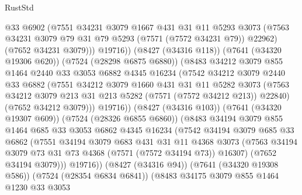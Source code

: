 \begin{lexlean}{RustStd}
\begin{coremodule}
{\begin{coremodule}
{{{{{{{{{{{{{{{{{{{{{{{{{{{{{{{{                      @33
                      @6902
                      (@7551
                        @34231
                        @3079
                        @1667
                        @431
                        @31
                        @11
                        @5293
                        @3073
                        (@7563 @34231 @3079 @79 @31 @79 @5293 (@7571 (@7572 @34231 @79)) @22962)
                        (@7652 @34231 @3079)))
                    @19716))
                (@8427 (@34316 @118))
                (@7641 (@34320 @19306 @620))
                (@7524 (@28298 @6875 @6880))
                (@8483
                  @34212
                  @3079
                  @855
                  @1464
                  @2440
                  @33
                  @3053
                  @6882
                  @4345
                  @16234
                  (@7542
                    @34212
                    @3079
                    @2440
                    @33
                    @6882
                    (@7551
                      @34212
                      @3079
                      @1660
                      @431
                      @31
                      @11
                      @5282
                      @3073
                      (@7563 @34212 @3079 @213 @31 @213 @5282 (@7571 (@7572 @34212 @213)) @22840)
                      (@7652 @34212 @3079)))
                  @19716))
              (@8427 (@34316 @103))
              (@7641 (@34320 @19307 @609))
              (@7524 (@28326 @6855 @6860))
              (@8483
                @34194
                @3079
                @855
                @1464
                @685
                @33
                @3053
                @6862
                @4345
                @16234
                (@7542
                  @34194
                  @3079
                  @685
                  @33
                  @6862
                  (@7551
                    @34194
                    @3079
                    @683
                    @431
                    @31
                    @11
                    @4368
                    @3073
                    (@7563 @34194 @3079 @73 @31 @73 @4368 (@7571 (@7572 @34194 @73)) @16307)
                    (@7652 @34194 @3079)))
                @19716))
            (@8427 (@34316 @94))
            (@7641 (@34320 @19308 @586))
            (@7524 (@28354 @6834 @6841))
            (@8483
              @34175
              @3079
              @855
              @1464
              @1230
              @33
              @3053
}}}}}}}}}}}}}}}}}}}}}}}}}}}}}}}}
\end{coremodule}}
\end{coremodule}
\end{lexlean}
